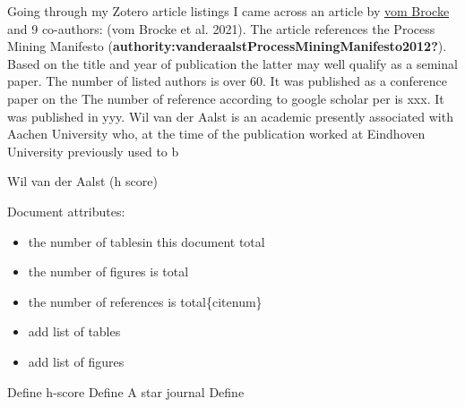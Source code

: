 \documentclass[
  letterpaper,
  DIV=11,
  numbers=noendperiod]{scrreprt}
\begin{document}
Going through my Zotero article listings I came across an article by
\href{https://janvombrocke.com/}{vom Brocke} and 9 co-authors: (vom
Brocke et al. 2021). The article references the Process Mining Manifesto
(\textbf{authority:vanderaalstProcessMiningManifesto2012?}). Based on
the title and year of publication the latter may well qualify as a
seminal paper. The number of listed authors is over 60. It was published
as a conference paper on the The number of reference according to google
scholar per is xxx. It was published in yyy. Wil van der Aalst is an
academic presently associated with Aachen University who, at the time of
the publication worked at Eindhoven University previously used to b

Wil van der Aalst (h score)

Document attributes:

\begin{itemize}
\item
  the number of tablesin this document total
\item
  the number of figures is total
\item
  the number of references is total\{citenum\}
\item
  add list of tables
\item
  add list of figures
\end{itemize}

Define h-score Define A star journal Define
\end{document}
